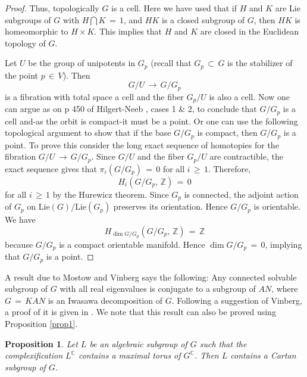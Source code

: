 \documentclass[12pt]{amsart}
\newtheorem{proposition}[theorem]{Proposition}
\begin{document}
\begin{proof}
Thus, topologically $G$ is a cell. Here we have used that if $H$ and $K$ are
Lie subgroups of $G$ with $H\bigcap K\,=\,1$, and $HK$ is a closed subgroup
of $G$, then $HK$ is homeomorphic to $H\times K$. This implies that $H$ and
$K$ are closed in the Euclidean topology of $G$.

Let $U$ be the group of unipotents in $G_{p}$ (recall that $G_{p}\,\subset
\,G$ is the stabilizer of the point $p\,\in \,V$). Then
\begin{equation*}
G/U\,\longrightarrow \,G/G_{p}
\end{equation*}
is a fibration with total space a cell and the fiber $G_{p}/U$ is also a
cell. Now one can argue as on p 450 of Hilgert-Neeb \cite[p. 885,
Proposition 2.2]{HN}, cases 1 \& 2, to conclude that $G/G_{p}$ is a cell
and-as the orbit is compact-it must be a point. Or one can use the following
topological argument to show that if the base $G/G_{p}$ is compact, then
$G/G_{p}$ is a point. To prove this consider the long exact sequence of
homotopies for the fibration $G/U\,\longrightarrow \,G/G_{p}$. Since $G/U$
and the fiber $G_{p}/U$ are contractible, the exact sequence gives that $\pi
_{i}(G/G_{p})\,=\,0$ for all $i\,\geq \,1$. Therefore,
\begin{equation*}
H_{i}(G/G_{p},\,{\mathbb{Z}})\,=\,0
\end{equation*}
for all $i\,\geq \,1$ by the Hurewicz theorem. Since $G_{p}$ is connected,
the adjoint action of $G_{p}$ on $\text{Lie}(G)/\text{Lie}(G_{p})$ preserves
its orientation. Hence $G/G_{p}$ is orientable. We have
\begin{equation*}
H_{\dim G/G_{p}}(G/G_{p},\,{\mathbb{Z}})\,=\,\mathbb{Z}
\end{equation*}
because $G/G_{p}$ is a compact orientable manifold. Hence $\dim G/G_{p}\,=\,0
$, implying that $G/G_{p}$ is a point.
\end{proof}

A result due to Mostow \cite{Mo} and Vinberg \cite{Vi} says the following:
Any connected solvable subgroup of $G$ with all real eigenvalues is
conjugate to a subgroup of $AN$, where $G\,=\, KAN$ is an Iwasawa
decomposition of $G$. Following a suggestion of Vinberg, a proof of it is
given in \cite[p. 885, Proposition 2.2]{AB}. We note that this result can
also be proved using Proposition \ref{prop1}.

\begin{proposition}
\label{prop2} Let $L$ be an algebraic subgroup of $G$ such that the
complexification $L^{\mathbb{C}}$ contains a maximal torus of $G^{\mathbb{C}}
$. Then $L$ contains a Cartan subgroup of $G$.
\end{proposition}
\end{document}
